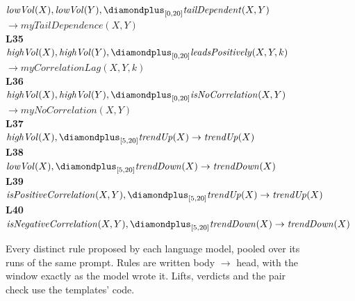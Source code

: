 \begin{figure}[t]
{\begin{minipage}{0.95\textwidth}
\hspace*{1.5em}\mbox{$\mathit{lowVol}(X), \mathit{lowVol}(Y), \diamondplus_{[0,20]} \mathit{tailDependent}(X,Y)$}\\
\hspace*{1.5em}\hspace*{3em}\mbox{$\to \mathit{myTailDependence}(X,Y)$}\\[4pt]
\textbf{L35}\\
\hspace*{1.5em}\mbox{$\mathit{highVol}(X), \mathit{highVol}(Y), \diamondplus_{[0,20]} \mathit{leadsPositively}(X,Y,k)$}\\
\hspace*{1.5em}\hspace*{3em}\mbox{$\to \mathit{myCorrelationLag}(X,Y,k)$}\\[4pt]
\textbf{L36}\\
\hspace*{1.5em}\mbox{$\mathit{highVol}(X), \mathit{highVol}(Y), \diamondplus_{[0,20]} \mathit{isNoCorrelation}(X,Y)$}\\
\hspace*{1.5em}\hspace*{3em}\mbox{$\to \mathit{myNoCorrelation}(X,Y)$}\\[4pt]
\textbf{L37}\\
\hspace*{1.5em}\mbox{$\mathit{highVol}(X), \diamondplus_{[5,20]} \mathit{trendUp}(X) \to \mathit{trendUp}(X)$}\\[4pt]
\textbf{L38}\\
\hspace*{1.5em}\mbox{$\mathit{lowVol}(X), \diamondplus_{[5,20]} \mathit{trendDown}(X) \to \mathit{trendDown}(X)$}\\[4pt]
\textbf{L39}\\
\hspace*{1.5em}\mbox{$\mathit{isPositiveCorrelation}(X,Y), \diamondplus_{[5,20]} \mathit{trendUp}(X) \to \mathit{trendUp}(X)$}\\[4pt]
\textbf{L40}\\
\hspace*{1.5em}\mbox{$\mathit{isNegativeCorrelation}(X,Y), \diamondplus_{[5,20]} \mathit{trendDown}(X) \to \mathit{trendDown}(X)$}
\end{minipage}}
\caption{\small{Every distinct rule proposed by each language model, pooled over its runs of the same prompt. Rules are written body $\to$ head, with the window exactly as the model wrote it. Lifts, verdicts and the pair check use the templates' code.}}
\label{fig:llm-rules}
\end{figure}
